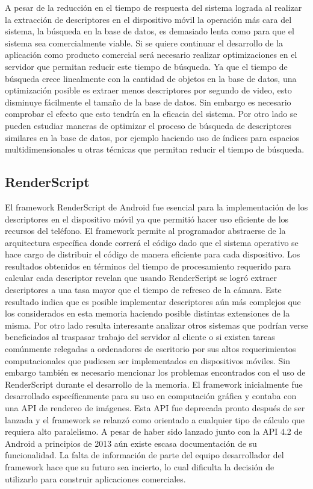 A pesar de la reducción en el tiempo de respuesta del sistema lograda al realizar la extracción de descriptores en el dispositivo móvil la operación más cara del sistema, la búsqueda en la base de datos, es demasiado lenta como para que el sistema sea comercialmente viable. Si se quiere continuar el desarrollo de la aplicación como producto comercial será necesario realizar optimizaciones en el servidor que permitan reducir este tiempo de búsqueda. Ya que el tiempo de búsqueda crece linealmente con la cantidad de objetos en la base de datos, una optimización posible es extraer menos descriptores por segundo de video, esto disminuye fácilmente el tamaño de la base de datos. Sin embargo es necesario comprobar el efecto que esto tendría en la eficacia del sistema. Por otro lado se pueden estudiar maneras de optimizar el proceso de búsqueda de descriptores similares en la base de datos, por ejemplo haciendo uso de índices para espacios multidimensionales u otras técnicas que permitan reducir el tiempo de búsqueda. 

\subsection*{RenderScript}
El framework RenderScript de Android fue esencial para la implementación de los descriptores en el dispositivo móvil ya que permitió hacer uso eficiente de los recursos del teléfono. El framework permite al programador abstraerse de la arquitectura específica donde correrá el código dado que el sistema operativo se hace cargo de distribuir el código de manera eficiente para cada dispositivo. Los resultados obtenidos en términos del tiempo de procesamiento requerido para calcular cada descriptor revelan que usando RenderScript se logró extraer descriptores a una tasa mayor que el tiempo de refresco de la cámara. Este resultado indica que es posible implementar descriptores aún más complejos que los considerados en esta memoria haciendo posible distintas extensiones de la misma. Por otro lado resulta interesante analizar otros sistemas que podrían verse beneficiados al traspasar trabajo del servidor al cliente o si existen tareas comúnmente relegadas a ordenadores de escritorio por sus altos requerimientos computacionales que pudiesen ser implementados en dispositivos móviles.
Sin embargo también es necesario mencionar los problemas encontrados con el uso de RenderScript durante el desarrollo de la memoria. El framework inicialmente fue desarrollado específicamente para su uso en computación gráfica y contaba con una API de rendereo de imágenes. Esta API fue deprecada pronto después de ser lanzada y el framework se relanzó como orientado a cualquier tipo de cálculo que requiera alto paralelismo. A pesar de haber sido lanzado junto con la API 4.2 de Android a principios de 2013 aún existe escasa documentación de su funcionalidad. La falta de información de parte del equipo desarrollador del framework hace que su futuro sea incierto, lo cual dificulta la decisión de utilizarlo para construir aplicaciones comerciales.

